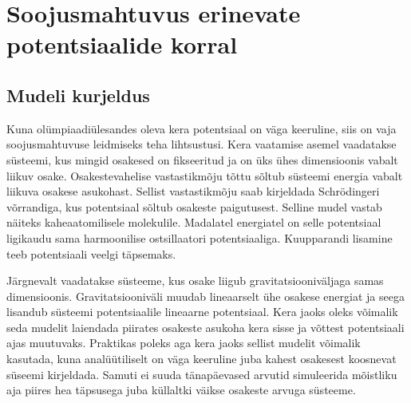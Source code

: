 \documentclass{trkut}%
\begin{document}

\chapter{Soojusmahtuvus erinevate potentsiaalide korral}

\section{Mudeli kurjeldus}

Kuna olümpiaadiülesandes oleva kera potentsiaal on väga keeruline, siis on vaja soojusmahtuvuse leidmiseks teha lihtsustusi.
Kera vaatamise asemel vaadatakse süsteemi, kus mingid osakesed on fikseeritud ja on üks ühes dimensioonis vabalt liikuv osake.
Osakestevahelise vastastikmõju tõttu sõltub süsteemi energia vabalt liikuva osakese asukohast.
Sellist vastastikmõju saab kirjeldada Schrödingeri võrrandiga, kus potentsiaal sõltub osakeste paigutusest.
Selline mudel vastab näiteks kaheaatomilisele molekulile.
Madalatel energiatel on selle potentsiaal ligikaudu sama harmoonilise ostsillaatori potentsiaaliga.
Kuupparandi lisamine teeb potentsiaali veelgi täpsemaks.

Järgnevalt vaadatakse süsteeme, kus osake liigub gravitatsiooniväljaga samas dimensioonis.
Gravitatsiooniväli muudab lineaarselt ühe osakese energiat ja seega lisandub süsteemi potentsiaalile lineaarne potentsiaal.
Kera jaoks oleks võimalik seda mudelit laiendada piirates osakeste asukoha kera sisse ja võttest potentsiaali ajas muutuvaks.
Praktikas poleks aga kera jaoks sellist mudelit võimalik kasutada, kuna analüütiliselt on väga keeruline juba kahest osakesest koosnevat süseemi kirjeldada.
Samuti ei suuda tänapäevased arvutid simuleerida mõistliku aja piires hea täpsusega juba küllaltki väikse osakeste arvuga süsteeme.
\end{document}
